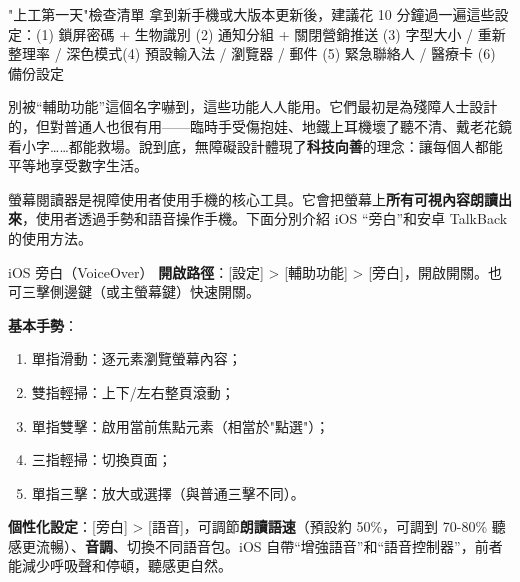 \begin{tcbinfo}{"上工第一天"檢查清單}
拿到新手機或大版本更新後，建議花 10 分鐘過一遍這些設定：\newline (1) 鎖屏密碼 + 生物識別 (2) 通知分組 + 關閉營銷推送 (3) 字型大小 / 重新整理率 / 深色模式\newline (4) 預設輸入法 / 瀏覽器 / 郵件 (5) 緊急聯絡人 / 醫療卡 (6) 備份設定

\end{tcbinfo}


別被“輔助功能”這個名字嚇到，這些功能人人能用。它們最初是為殘障人士設計的，但對普通人也很有用——臨時手受傷抱娃、地鐵上耳機壞了聽不清、戴老花鏡看小字……都能救場。說到底，無障礙設計體現了\textbf{科技向善}的理念：讓每個人都能平等地享受數字生活。


螢幕閱讀器是視障使用者使用手機的核心工具。它會把螢幕上\textbf{所有可視內容朗讀出來}，使用者透過手勢和語音操作手機。下面分別介紹 iOS “旁白”和安卓 TalkBack 的使用方法。

\begin{tcbinfo}{iOS 旁白（VoiceOver）}
\textbf{開啟路徑}：[設定] > [輔助功能] > [旁白]，開啟開關。也可三擊側邊鍵（或主螢幕鍵）快速開關。

\textbf{基本手勢}：

\begin{enumerate}
  \item 單指滑動：逐元素瀏覽螢幕內容；
  \item 雙指輕掃：上下/左右整頁滾動；
  \item 單指雙擊：啟用當前焦點元素（相當於"點選"）；
  \item 三指輕掃：切換頁面；
  \item 單指三擊：放大或選擇（與普通三擊不同）。
\end{enumerate}

\textbf{個性化設定}：[旁白] > [語音]，可調節\textbf{朗讀語速}（預設約 50\%，可調到 70-80\% 聽感更流暢）、\textbf{音調}、切換不同語音包。iOS 自帶“增強語音”和“語音控制器”，前者能減少呼吸聲和停頓，聽感更自然。

\end{tcbinfo}

